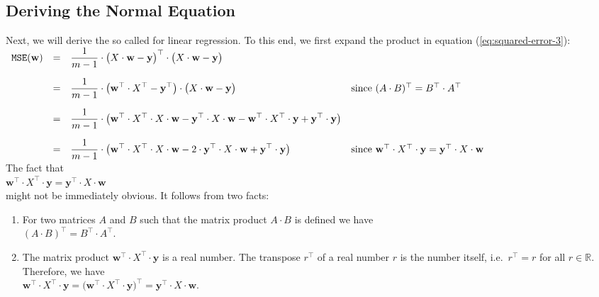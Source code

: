 \subsection{Deriving the Normal Equation}
Next, we will derive the so called  
for linear regression.  To this end, we first
expand the product in equation (\ref{eq:squared-error-3}):
\\[0.2cm]
\hspace*{0.3cm}
$
\begin{array}[t]{lcll}
 \mathtt{MSE}(\mathbf{w}) & = & 
 \displaystyle \frac{1}{m-1} \cdot \bigl(X \cdot \mathbf{w} - \textbf{y}\bigr)^\top \cdot \bigl(X \cdot \mathbf{w} - \textbf{y}\bigr) 
 \\[0.5cm]
 & = & 
 \displaystyle \frac{1}{m-1} \cdot \bigl(\mathbf{w}^\top \cdot X^\top - \textbf{y}^\top\bigr) \cdot \bigl(X \cdot \mathbf{w} - \textbf{y}\bigr) 
 & \mbox{since $(A \cdot B)^\top = B^\top \cdot A^\top$}
 \\[0.5cm]
 & = & 
 \displaystyle \frac{1}{m-1} \cdot \bigl(\mathbf{w}^\top \cdot X^\top \cdot X \cdot \mathbf{w} 
                             - \textbf{y}^\top \cdot X \cdot \mathbf{w} 
                             - \mathbf{w}^\top \cdot X^\top \cdot \mathbf{y}
                             + \mathbf{y}^\top \cdot \mathbf{y}
                       \bigr)
 \\[0.5cm]
 & = & 
 \displaystyle \frac{1}{m-1} \cdot \bigl(\mathbf{w}^\top \cdot X^\top \cdot X \cdot \mathbf{w} 
                             - 2 \cdot \textbf{y}^\top \cdot X \cdot \mathbf{w} 
                             + \mathbf{y}^\top \cdot \mathbf{y}
                       \bigr)
 & \mbox{since $\mathbf{w}^\top \cdot X^\top \cdot \mathbf{y} = \textbf{y}^\top \cdot X \cdot \mathbf{w}$}
\end{array}
$
\\[0.2cm]
The fact that 
\\[0.2cm]
\hspace*{1.3cm}
$\mathbf{w}^\top \cdot X^\top \cdot \mathbf{y} = \textbf{y}^\top \cdot X \cdot \mathbf{w}$
\\[0.2cm]
might not be immediately obvious.  It follows from two facts:
\begin{enumerate}
\item For two matrices $A$ and $B$ such that the matrix product $A \cdot B$ is defined we have 
      \\[0.2cm]
      \hspace*{1.3cm}
      $(A \cdot B)^\top = B^\top \cdot A^\top$.
\item The matrix product $\mathbf{w}^\top \cdot X^\top \cdot \mathbf{y}$ is a real number.  The transpose $r^\top$ of a real number $r$ is the number
      itself, i.e.~$r^\top = r$ for all $r \in \mathbb{R}$.  Therefore, we have
      \\[0.2cm]
      \hspace*{1.3cm}
      $\mathbf{w}^\top \cdot X^\top \cdot \mathbf{y} = 
\bigl(\mathbf{w}^\top \cdot X^\top \cdot \mathbf{y}\bigr)^\top =
\mathbf{y}^\top \cdot X \cdot \mathbf{w}
$.
\end{enumerate}
